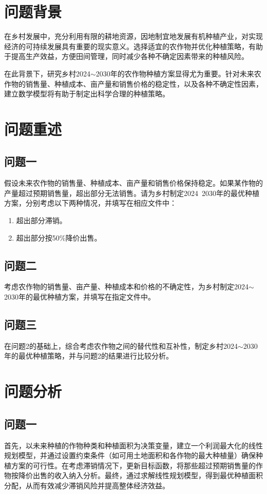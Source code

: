 \documentclass[withoutpreface,bwprint]{cumcmthesis} %
\begin{document}

\section{问题背景}
在乡村发展中，充分利用有限的耕地资源，因地制宜地发展有机种植产业，对实现经济的可持续发展具有重要的现实意义。选择适宜的农作物并优化种植策略，有助于提高生产效益，方便田间管理，同时减少各种不确定因素带来的种植风险。

在此背景下，研究乡村2024$\sim$2030年的农作物种植方案显得尤为重要。针对未来农作物的销售量、种植成本、亩产量和销售价格的稳定性，以及各种不确定性因素，建立数学模型将有助于制定出科学合理的种植策略。

\section{问题重述}
        \subsection{问题一}
        假设未来农作物的销售量、种植成本、亩产量和销售价格保持稳定。如果某作物的产量超过预期销售量，超出部分无法销售。请为乡村制定2024~2030年的最优种植方案，分别考虑以下两种情况，并填写在相应文件中：
        \begin{enumerate}
        	\item 超出部分滞销。
        	\item 超出部分按50$\%$降价出售。
        	
        \end{enumerate}
        \subsection{问题二}
        考虑农作物的销售量、亩产量、种植成本和价格的不确定性，为乡村制定2024$\sim$2030年的最优种植方案，并填写在指定文件中。
        \subsection{问题三}
        在问题2的基础上，综合考虑农作物之间的替代性和互补性，制定乡村2024$\sim$2030年的最优种植策略，并与问题2的结果进行比较分析。
        
\section{问题分析}
	\subsection{问题一}
	首先，以未来种植的作物种类和种植面积为决策变量，建立一个利润最大化的线性规划模型，并通过设置约束条件（如可用土地面积和各作物的最大种植量）确保种植方案的可行性。在考虑滞销情况下，更新目标函数，将那些超过预期销售量的作物按降价出售的收入纳入分析。最终，通过求解线性规划模型，得到最优种植面积分配，从而有效减少滞销风险并提高整体经济效益。
\end{document}

